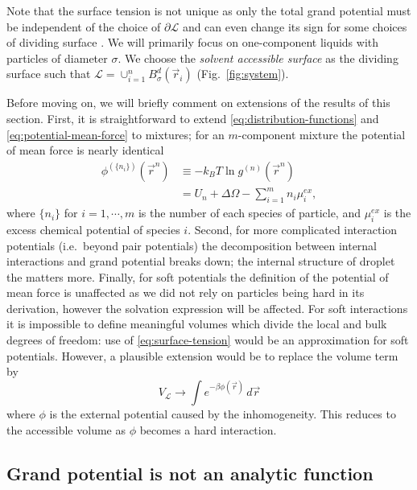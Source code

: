 \documentclass[11pt]{report}
\begin{document}
Note that the surface tension is not unique as only the total grand potential must be independent of the choice of $\partial\mathcal{L}$ and can even change its sign for some choices of dividing surface \cite{Bryk2003}.
We will primarily focus on one-component liquids with particles of diameter $\sigma$.
We choose the \emph{solvent accessible surface} \cite{Lee1971} as the dividing surface such that $\mathcal{L} = \cup_{i=1}^n B^d_\sigma(\vec{r}_i)$ (Fig.\ \ref{fig:system}).

Before moving on, we will briefly comment on extensions of the results of this section.
First, it is straightforward to extend \eqref{eq:distribution-functions} and \eqref{eq:potential-mean-force} to mixtures; for an $m$-component mixture the potential of mean force is nearly identical
\begin{equation}
  \begin{split}
    \phi^{(\{n_i\})}(\vec{r}^n) &\equiv
    - k_B T \ln{g^{(n)}(\vec{r}^n)} \\
    &=
    U_n + \Delta\Omega - \sum_{i=1}^m n_i \mu_i^{ex},
  \end{split}
\end{equation}
where $\{n_i\}$ for $i = 1, \cdots, m$ is the number of each species of particle, and $\mu_i^{ex}$ is the excess chemical potential of species $i$.
Second, for more complicated interaction potentials (i.e.\ beyond pair potentials) the decomposition between internal interactions and grand potential breaks down; the internal structure of droplet the matters more.
Finally, for soft potentials the definition of the potential of mean force is unaffected as we did not rely on particles being hard in its derivation, however the solvation expression will be affected.
For soft interactions it is impossible to define meaningful volumes which divide the local and bulk degrees of freedom: use of \eqref{eq:surface-tension} would be an approximation for soft potentials.
However, a plausible extension would be to replace the volume term by
\begin{equation}
  V_\mathcal{L} \to \int e^{-\beta \phi(\vec{r})} \, d\vec{r}
\end{equation}
where $\phi$ is the external potential caused by the inhomogeneity.
This reduces to the accessible volume as $\phi$ becomes a hard interaction.

\subsection{Grand potential is not an analytic function}
\end{document}
